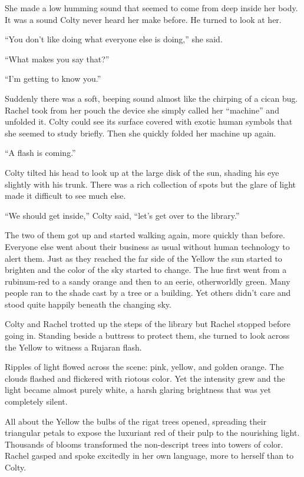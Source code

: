 She made a low humming sound that seemed to come from deep inside her body. It was a sound Colty
never heard her make before. He turned to look at her.

``You don't like doing what everyone else is doing,'' she said.

``What makes you say that?''

``I'm getting to know you.''

Suddenly there was a soft, beeping sound almost like the chirping of a cican bug. Rachel took
from her pouch the device she simply called her ``machine'' and unfolded it. Colty could see its
surface covered with exotic human symbols that she seemed to study briefly. Then she quickly
folded her machine up again.

``A flash is coming.''

Colty tilted his head to look up at the large disk of the sun, shading his eye slightly with his
trunk. There was a rich collection of spots but the glare of light made it difficult to see much
else.

``We should get inside,'' Colty said, ``let's get over to the library.''

The two of them got up and started walking again, more quickly than before. Everyone else went
about their business as usual without human technology to alert them. Just as they reached the
far side of the Yellow the sun started to brighten and the color of the sky started to change.
The hue first went from a rubinum-red to a sandy orange and then to an eerie, otherworldly
green. Many people ran to the shade cast by a tree or a building. Yet others didn't care and
stood quite happily beneath the changing sky.

Colty and Rachel trotted up the steps of the library but Rachel stopped before going in.
Standing beside a buttress to protect them, she turned to look across the Yellow to witness a
Rujaran flash.

Ripples of light flowed across the scene: pink, yellow, and golden orange. The clouds flashed
and flickered with riotous color. Yet the intensity grew and the light became almost purely
white, a harsh glaring brightness that was yet completely silent.

All about the Yellow the bulbs of the rigat trees opened, spreading their triangular petals to
expose the luxuriant red of their pulp to the nourishing light. Thousands of blooms transformed
the non-descript trees into towers of color. Rachel gasped and spoke excitedly in her own
language, more to herself than to Colty.


